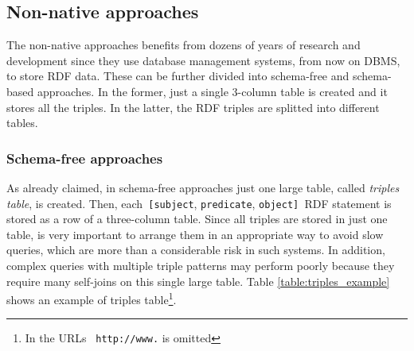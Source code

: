 \documentclass[10pt, a4paper]{report}
\begin{document}
\subsection{Non-native approaches}

The non-native approaches benefits from dozens of years of research and development since they use database management systems, from now on DBMS, to store RDF data. These can be further divided into schema-free and schema-based approaches. In the former, just a single 3-column table is created and it stores all the triples. In the latter, the RDF triples are splitted into different tables.

\subsubsection{Schema-free approaches}

As already claimed, in schema-free approaches just one large table, called \textit{triples table}, is created. Then, each\texttt{ [subject}, \texttt{predicate}, \texttt{object] }RDF statement is stored as a row of a three-column table. Since all triples are stored in just one table, is very important to arrange them in an appropriate way to avoid slow queries, which are more than a considerable risk in such systems. In addition, complex queries with multiple triple patterns may perform poorly because they require many self-joins on this single large table. Table \ref{table:triples_example} shows an example of triples table\footnote{In the URLs \texttt{ http://www.} is omitted}.
\end{document}
